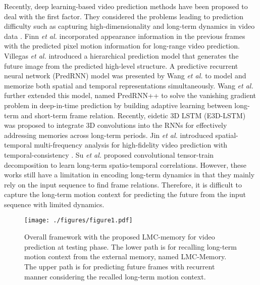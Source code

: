 \documentclass[final]{cvpr}
\begin{document}
Recently, deep learning-based video prediction methods have been proposed to deal with the first factor. They considered the problems leading to prediction difficulty such as capturing high-dimensionality and long-term dynamics in video data \cite{patraucean2015spatio,finn2016unsupervised,villegas2017decomposing, villegas2017learning,kalchbrenner2017video,wang2017predrnn, villegas2018hierarchical,gao2019disentangling,ye2019compositional,xu2018video,byeon2018contextvp,wang2018predrnn++,wang2018eidetic,minderer2019unsupervised,villegas2019high,kim2019unsupervised,yu2020efficient, wu2020future, jin2020exploring, su2020convolutional}. Finn \textit{et al.} \cite{finn2016unsupervised} incorporated appearance information in the previous frames with the predicted pixel motion information for long-range video prediction. Villegas \textit{et al.} \cite{villegas2017learning} introduced a hierarchical prediction model that generates the future image from the predicted high-level structure. A predictive recurrent neural network (PredRNN) model was presented by Wang \textit{et al.} \cite{wang2017predrnn} to model and memorize both spatial and temporal representations simultaneously. Wang \textit{et al.}  \cite{wang2018predrnn++} further extended this model, named PredRNN++ to solve the vanishing gradient problem in deep-in-time prediction by building adaptive learning between long-term and short-term frame relation. Recently, eidetic 3D LSTM (E3D-LSTM) \cite{wang2018eidetic} was proposed  to integrate 3D convolutions into the RNNs for effectively addressing memories across long-term periods. Jin \textit{et al.} \cite{jin2020exploring} introduced spatial-temporal multi-frequency analysis for high-fidelity video prediction with temporal-consistency . Su \textit{et al.} \cite{su2020convolutional} proposed convolutional tensor-train decomposition to learn long-term spatio-temporal correlations.  However, these works still have a limitation in encoding long-term dynamics in that they mainly rely on the input sequence to find frame relations. Therefore, it is difficult to capture the long-term motion context for predicting the future from the input sequence with limited dynamics.

\begin{figure*}[t]
	\begin{minipage}[b]{1.0\linewidth}
		\centering
		\centerline{\texttt{[image: ./figures/figure1.pdf]}}
	\end{minipage}
		\vspace{-0.6cm}
	\caption{Overall framework with the proposed LMC-memory for video prediction at testing phase. The lower path is for recalling long-term motion context from the external memory, named LMC-Memory. The upper path is for predicting future frames with recurrent manner considering  the recalled long-term motion context.}
	\label{figure1}
		\vspace{-0.2cm}
\end{figure*}
\end{document}
